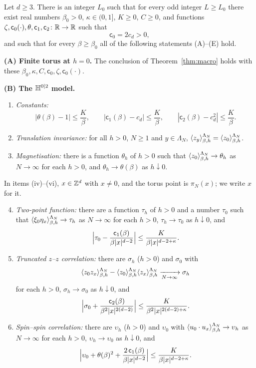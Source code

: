 \documentclass[11pt]{amsart}
\numberwithin{equation}{section}
\numberwithin{theorem}{section}
\begin{document}
\begin{theorem}\label{thm:all}
Let $d\ge3$. There is an integer $L_0$ such that for every odd integer $L\ge L_0$ there exist
real numbers $\beta_0>0$, $\kappa\in(0,1]$, $K\ge0$, $C\ge0$, and functions
$\zeta,\mathsf c_0(\cdot),\theta,\mathsf c_1,\mathsf c_2\colon\mathbb{R}\to\mathbb{R}$ such that
\begin{equation}\label{e:c0}
  \mathsf c_0=2c_d>0,
\end{equation}
and such that for every $\beta\ge\beta_0$ all of the following statements (A)--(E) hold.

\smallskip\noindent\textbf{(A) Finite torus at $h=0$.} The conclusion of
Theorem~\ref{thm:macro} holds with these $\beta_0,\kappa,C,\mathsf c_0,\zeta,\mathsf c_0(\cdot)$.

\smallskip\noindent\textbf{(B) The $\mathbb{H}^{0|2}$ model.}
\begin{enumerate}
\item \emph{Constants:}
  \begin{equation}\label{e:h02-const}
    |\theta(\beta)-1|\le\frac K\beta,\qquad |\mathsf c_1(\beta)-c_d|\le\frac K\beta,\qquad
    |\mathsf c_2(\beta)-c_d^2|\le\frac K\beta.
  \end{equation}
\item \emph{Translation invariance:} for all $h>0$, $N\ge1$ and $y\in\Lambda_N$,
  $\langle z_y \rangle^{\Lambda_N}_{\beta,h}=\langle z_0 \rangle^{\Lambda_N}_{\beta,h}$.
\item \emph{Magnetisation:} there is a function $\theta_h$ of $h>0$ such that
  $\langle z_0 \rangle^{\Lambda_N}_{\beta,h}\to\theta_h$ as $N\to\infty$ for each $h>0$, and
  $\theta_h\to\theta(\beta)$ as $h\downarrow0$.
\end{enumerate}
In items (iv)--(vi), $x\in\mathbb{Z}^d$ with $x\ne0$, and the torus point is $\pi_N(x)$; we write
$x$ for it.
\begin{enumerate}\setcounter{enumi}{3}
\item \emph{Two-point function:} there are a function $\tau_h$ of $h>0$ and a number $\tau_0$
  such that $\langle \xi_0\eta_{x} \rangle^{\Lambda_N}_{\beta,h}\to\tau_h$ as $N\to\infty$ for each
  $h>0$, $\tau_h\to\tau_0$ as $h\downarrow0$, and
  \[
    \Bigl|\tau_0-\frac{\mathsf c_1(\beta)}{\beta|x|^{d-2}}\Bigr|\le\frac{K}{\beta|x|^{d-2+\kappa}}.
  \]
\item \emph{Truncated $z$--$z$ correlation:} there are $\sigma_h$ ($h>0$) and $\sigma_0$ with
  \[
    \langle z_0z_{x} \rangle^{\Lambda_N}_{\beta,h}-\langle z_0 \rangle^{\Lambda_N}_{\beta,h}
      \langle z_{x} \rangle^{\Lambda_N}_{\beta,h}\xrightarrow[N\to\infty]{}\sigma_h
  \]
  for each $h>0$, $\sigma_h\to\sigma_0$ as $h\downarrow0$, and
  \[
    \Bigl|\sigma_0+\frac{\mathsf c_2(\beta)}{\beta^2|x|^{2(d-2)}}\Bigr|\le\frac{K}{\beta^2|x|^{2(d-2)+\kappa}}.
  \]
\item \emph{Spin--spin correlation:} there are $\upsilon_h$ ($h>0$) and $\upsilon_0$ with
  $\langle u_0\cdot u_{x} \rangle^{\Lambda_N}_{\beta,h}\to\upsilon_h$ as $N\to\infty$ for each
  $h>0$, $\upsilon_h\to\upsilon_0$ as $h\downarrow0$, and
  \[
    \Bigl|\upsilon_0+\theta(\beta)^2+\frac{2\,\mathsf c_1(\beta)}{\beta|x|^{d-2}}\Bigr|\le\frac{K}{\beta|x|^{d-2+\kappa}}.
  \]
\end{enumerate}


\end{theorem}
\end{document}
